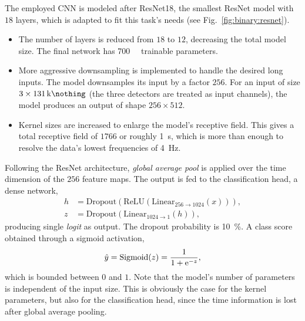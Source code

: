 The employed CNN is modeled after ResNet18, the smallest ResNet model with $18$ layers, which is adapted to fit this task's needs (see Fig.~\ref{fig:binary:resnet}). 
\begin{itemize}
\item The number of layers is reduced from $18$ to $12$, decreasing the total model size. The final network has \SI{700}{\kilo\nothing} trainable parameters. 
\item  More aggressive downsampling is implemented to handle the desired long inputs. The model downsamples its input by a factor $256$. For an input of size $3\times\SI{131}{\kilo\nothing}$ (the three detectors are treated as input channels), the model produces an output of shape $256\times512$.
\item  Kernel sizes are increased to enlarge the model's receptive field. This gives a total receptive field of $1766$ or roughly \SI{1}{\second}, which is more than enough to resolve the data's lowest frequencies of \SI{4}{\hertz}.
\end{itemize}
Following the ResNet architecture, \emph{global average pool} is applied over the time dimension of the $256$ feature maps. The output is fed to the classification head, a dense network, 
\begin{align}
	h &= \mathrm{Dropout}(\mathrm{ReLU}(\mathrm{Linear}_{256\rightarrow1024}(x))),\\
	z &= \mathrm{Dropout}(\mathrm{Linear}_{1024\rightarrow1}(h)),
\end{align}
producing single \emph{logit} as output. The dropout probability is \SI{10}{\percent}. A class score obtained through a sigmoid activation,
\begin{equation}
	\hat{y} = \text{Sigmoid}(z) = \frac{1}{1+\mathrm{e}^{-z}},
\end{equation}
which is bounded between $0$ and $1$. 
Note that the model's number of parameters is independent of the input size. This is obviously the case for the kernel parameters, but also for the classification head, since the time information is lost after global average pooling.


